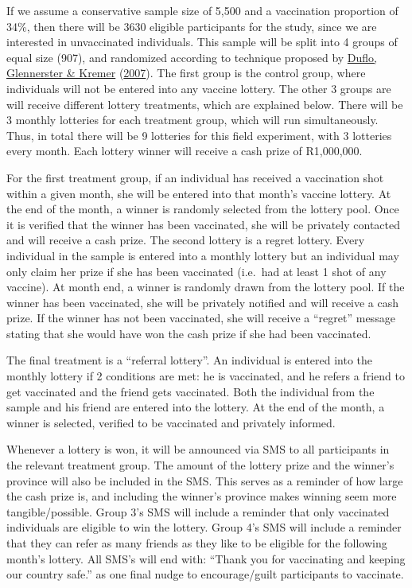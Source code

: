 \documentclass[11pt,preprint, authoryear]{elsarticle}
\numberwithin{equation}{section}
\numberwithin{figure}{section}
\numberwithin{table}{section}
\begin{document}
If we assume a conservative sample size of 5,500 and a vaccination
proportion of 34\%, then there will be 3630 eligible participants for
the study, since we are interested in unvaccinated individuals. This
sample will be split into 4 groups of equal size (907), and randomized
according to technique proposed by \protect\hyperlink{ref-random}{Duflo,
Glennerster \& Kremer} (\protect\hyperlink{ref-random}{2007}). The first
group is the control group, where individuals will not be entered into
any vaccine lottery. The other 3 groups are will receive different
lottery treatments, which are explained below. There will be 3 monthly
lotteries for each treatment group, which will run simultaneously. Thus,
in total there will be 9 lotteries for this field experiment, with 3
lotteries every month. Each lottery winner will receive a cash prize of
R1,000,000.

For the first treatment group, if an individual has received a
vaccination shot within a given month, she will be entered into that
month's vaccine lottery. At the end of the month, a winner is randomly
selected from the lottery pool. Once it is verified that the winner has
been vaccinated, she will be privately contacted and will receive a cash
prize. The second lottery is a regret lottery. Every individual in the
sample is entered into a monthly lottery but an individual may only
claim her prize if she has been vaccinated (i.e.~had at least 1 shot of
any vaccine). At month end, a winner is randomly drawn from the lottery
pool. If the winner has been vaccinated, she will be privately notified
and will receive a cash prize. If the winner has not been vaccinated,
she will receive a ``regret'' message stating that she would have won
the cash prize if she had been vaccinated.

The final treatment is a ``referral lottery''. An individual is entered
into the monthly lottery if 2 conditions are met: he is vaccinated, and
he refers a friend to get vaccinated and the friend gets vaccinated.
Both the individual from the sample and his friend are entered into the
lottery. At the end of the month, a winner is selected, verified to be
vaccinated and privately informed.

Whenever a lottery is won, it will be announced via SMS to all
participants in the relevant treatment group. The amount of the lottery
prize and the winner's province will also be included in the SMS. This
serves as a reminder of how large the cash prize is, and including the
winner's province makes winning seem more tangible/possible. Group 3's
SMS will include a reminder that only vaccinated individuals are
eligible to win the lottery. Group 4's SMS will include a reminder that
they can refer as many friends as they like to be eligible for the
following month's lottery. All SMS's will end with: ``Thank you for
vaccinating and keeping our country safe.'' as one final nudge to
encourage/guilt participants to vaccinate.
\end{document}

